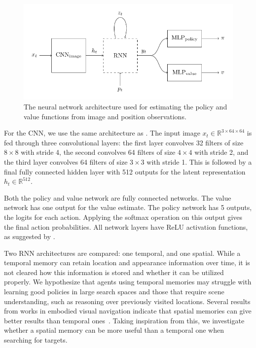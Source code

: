 \begin{figure}
    \centering
    \includegraphics{figures/architecture.pdf}
    \caption[Network architecture]{The neural network architecture used for estimating the policy and value functions from image and position observations.}
    \label{fig:architecture}
\end{figure}

For the CNN, we use the same architecture as \cite{mnih_human-level_2015}.
The input image \(x_t \in \mathbb{R}^{3 \times 64 \times 64}\) is fed through three convolutional layers: the first layer convolves 32 filters of size \(8 \times 8\) with stride 4, the second convolves 64 filters of size \(4 \times 4\) with stride 2, and the third layer convolves 64 filters of size \(3 \times 3\) with stride 1.
This is followed by a final fully connected hidden layer with 512 outputs for the latent representation \(h_t \in \mathbb{R}^{512}\).

Both the policy and value network are fully connected networks.
The value network has one output for the value estimate.
The policy network has 5 outputs, the logits for each action.
Applying the softmax operation on this output gives the final action probabilities.
All network layers have ReLU activation functions, as suggested by \cite{henderson_deep_2018}.

Two RNN architectures are compared: one temporal, and one spatial.
While a temporal memory can retain location and appearance information over time, it is not cleared how this information is stored and whether it can be utilized properly.
We hypothesize that agents using temporal memories may struggle with learning good policies in large search spaces and those that require scene understanding, such as reasoning over previously visited locations.
Several results from works in embodied visual navigation indicate that spatial memories can give better results than temporal ones~\cite{parisotto_neural_2017,henriques_mapnet_2018,gupta_cognitive_2019,chaplot_object_2020}.
Taking inspiration from this, we investigate whether a spatial memory can be more useful than a temporal one when searching for targets.

